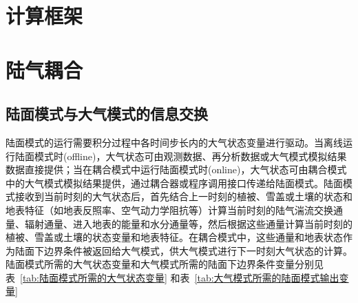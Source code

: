 \section{计算框架}\label{计算框架}



\section{陆气耦合}\label{陆气耦合}
\subsection{陆面模式与大气模式的信息交换}
陆面模式的运行需要积分过程中各时间步长内的大气状态变量进行驱动。当离线运行陆面模式时(offline)，大气状态可由观测数据、再分析数据或大气模式模拟结果数据直接提供；当在耦合模式中运行陆面模式时(online)，大气状态可由耦合模式中的大气模式模拟结果提供，通过耦合器或程序调用接口传递给陆面模式。陆面模式接收到当前时刻的大气状态后，首先结合上一时刻的植被、雪盖或土壤的状态和地表特征（如地表反照率、空气动力学阻抗等）计算当前时刻的陆气湍流交换通量、辐射通量、进入地表的能量和水分通量等，然后根据这些通量计算当前时刻的植被、雪盖或土壤的状态变量和地表特征。在耦合模式中，这些通量和地表状态作为陆面下边界条件被返回给大气模式，供大气模式进行下一时刻大气状态的计算。陆面模式所需的大气状态变量和大气模式所需的陆面下边界条件变量分别见表~\ref{tab:陆面模式所需的大气状态变量} 和表~\ref{tab:大气模式所需的陆面模式输出变量} 


